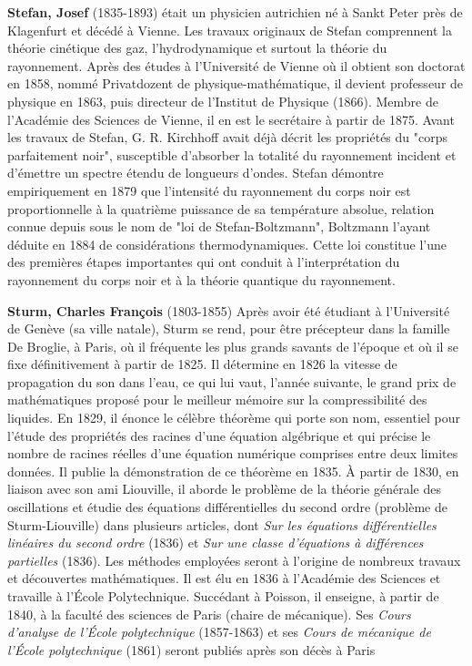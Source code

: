 \textbf{Stefan, Josef} (1835-1893) était un physicien autrichien né à Sankt Peter près de Klagenfurt et décédé à Vienne. Les travaux originaux de Stefan comprennent la théorie cinétique des gaz, l'hydrodynamique et surtout la théorie du rayonnement. Après des études à l'Université de Vienne où il obtient son doctorat en 1858, nommé Privatdozent de physique-mathématique, il devient professeur de physique en 1863, puis directeur de l'Institut de Physique (1866). Membre de l'Académie des Sciences de Vienne, il en est le secrétaire à partir de 1875. Avant les travaux de Stefan, G. R. Kirchhoff avait déjà décrit les propriétés du "corps parfaitement noir", susceptible d'absorber la totalité du rayonnement incident et d'émettre un spectre étendu de longueurs d'ondes. Stefan démontre empiriquement en 1879 que l'intensité du rayonnement du corps noir est proportionnelle à la quatrième puissance de sa température absolue, relation connue depuis sous le nom de "loi de Stefan-Boltzmann", Boltzmann l'ayant déduite en 1884 de considérations thermodynamiques. Cette loi constitue l'une des premières étapes importantes qui ont conduit à l'interprétation du rayonnement du corps noir et à la théorie quantique du rayonnement.

\textbf{Sturm, Charles François} (1803-1855) Après avoir été étudiant à l'Université de Genève (sa ville natale), Sturm se rend, pour être précepteur dans la famille De Broglie, à Paris, où il fréquente les plus grands savants de l'époque et où il se fixe définitivement à partir de 1825. Il détermine en 1826 la vitesse de propagation du son dans l'eau, ce qui lui vaut, l'année suivante, le grand prix de mathématiques proposé pour le meilleur mémoire sur la compressibilité des liquides. En 1829, il énonce le célèbre théorème qui porte son nom, essentiel pour l'étude des propriétés des racines d'une équation algébrique et qui précise le nombre de racines réelles d'une équation numérique comprises entre deux limites données. Il publie la démonstration de ce théorème en 1835. À partir de 1830, en liaison avec son ami Liouville, il aborde le problème de la théorie générale des oscillations et étudie des équations différentielles du second ordre (problème de Sturm-Liouville) dans plusieurs articles, dont \textit{Sur les équations différentielles linéaires du second ordre} (1836) et\textit{ Sur une classe d'équations à différences partielles} (1836). Les méthodes employées seront à l'origine de nombreux travaux et découvertes mathématiques. Il est élu en 1836 à l'Académie des Sciences et travaille à l'École Polytechnique. Succédant à Poisson, il enseigne, à partir de 1840, à la faculté des sciences de Paris (chaire de mécanique). Ses \textit{Cours d'analyse de l'École polytechnique} (1857-1863) et ses \textit{Cours de mécanique de l'École polytechnique} (1861) seront publiés après son décès à Paris

